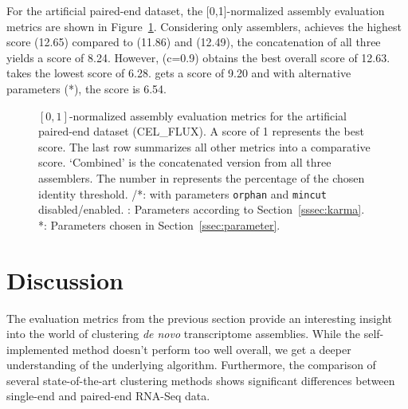 \documentclass[12pt,a4paper,english]{article}
\begin{document}
	\newpage
    For the artificial paired-end \celegans dataset, the [0,1]-normalized assembly evaluation metrics are shown in Figure~\ref{img:cel_flux}. Considering only assemblers, \trinity achieves the highest score (12.65) compared to \soap (11.86) and \spades (12.49), the concatenation of all three yields a score of 8.24.
	However, \cdhit (c=0.9) obtains the best overall score of 12.63. \grouper takes the lowest score of 6.28. \karma gets a score of 9.20 and with alternative parameters (\karma{}*), the score is 6.54.

	\begin{figure}[H]
		\hspace{-13pt}
		\def\svgwidth{1.1\textwidth}
		
		\caption[Normalized assembly evaluation metrics (\celegans, PE, CEL\_FLUX).]{$[0,1]$-normalized assembly evaluation metrics for the artificial paired-end \celegans dataset (CEL\_FLUX). A score of 1 represents the best score. The last row summarizes all other metrics into a comparative score. `Combined' is the concatenated version from all three assemblers. The number in \cdhit represents the percentage of the chosen identity threshold. \grouper/\grouper{}*: \grouper with parameters \texttt{orphan} and \texttt{mincut} disabled/enabled. \karma: Parameters according to Section~\ref{sssec:karma}. \karma{}*: Parameters chosen in Section~\ref{ssec:parameter}. }
		\label{img:cel_flux}
	\end{figure}


\newpage
\section{Discussion}
	The evaluation metrics from the previous section provide an interesting insight into the world of clustering \textit{de novo} transcriptome assemblies.
	While the self-implemented method \karma doesn't perform too well overall, we get a deeper understanding of the underlying algorithm. Furthermore, the comparison of several state-of-the-art clustering methods shows significant differences between single-end and paired-end RNA-Seq data.
\end{document}
